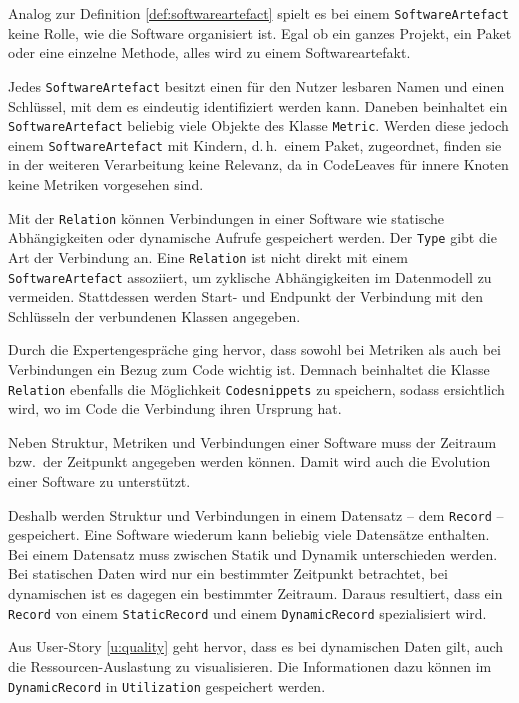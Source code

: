 Analog zur Definition \ref{def:softwareartefact} spielt es bei einem \texttt{SoftwareArtefact} keine Rolle, wie die Software organisiert ist. Egal ob ein ganzes Projekt, ein Paket oder eine einzelne Methode, alles wird zu einem Softwareartefakt.

Jedes \texttt{SoftwareArtefact} besitzt einen für den Nutzer lesbaren Namen und einen Schlüssel, mit dem es eindeutig identifiziert werden kann. Daneben beinhaltet ein \texttt{SoftwareArtefact} beliebig viele Objekte des Klasse \texttt{Metric}. Werden diese jedoch einem \texttt{SoftwareArtefact} mit Kindern, d.\,h.\ einem Paket, zugeordnet, finden sie in der weiteren Verarbeitung keine Relevanz, da in CodeLeaves für innere Knoten keine Metriken vorgesehen sind.

Mit der \texttt{Relation} können Verbindungen in einer Software wie statische Abhängigkeiten oder dynamische Aufrufe gespeichert werden. Der \texttt{Type} gibt die Art der Verbindung an. Eine \texttt{Relation} ist nicht direkt mit einem \texttt{SoftwareArtefact} assoziiert, um zyklische Abhängigkeiten im Datenmodell zu vermeiden. Stattdessen werden Start- und Endpunkt der Verbindung mit den Schlüsseln der verbundenen Klassen angegeben.

Durch die Expertengespräche ging hervor, dass sowohl bei Metriken als auch bei Verbindungen ein Bezug zum Code wichtig ist. Demnach beinhaltet die Klasse \texttt{Relation} ebenfalls die Möglichkeit \texttt{Codesnippets} zu speichern, sodass ersichtlich wird, wo im Code die Verbindung ihren Ursprung hat.

Neben Struktur, Metriken und Verbindungen einer Software muss der Zeitraum bzw.\ der Zeitpunkt angegeben werden können. Damit wird auch die Evolution einer Software zu unterstützt.

Deshalb werden Struktur und Verbindungen in einem Datensatz -- dem \texttt{Record} -- gespeichert. Eine Software wiederum kann beliebig viele Datensätze enthalten. Bei einem Datensatz muss zwischen Statik und Dynamik unterschieden werden. Bei statischen Daten wird nur ein bestimmter Zeitpunkt betrachtet, bei dynamischen ist es dagegen ein bestimmter Zeitraum. Daraus resultiert, dass ein \texttt{Record} von einem \texttt{StaticRecord} und einem \texttt{DynamicRecord} spezialisiert wird.

Aus User-Story \ref{u:quality} geht hervor, dass es bei dynamischen Daten gilt, auch die Ressourcen-Auslastung zu visualisieren. Die Informationen dazu können im \texttt{DynamicRecord} in \texttt{Utilization} gespeichert werden.

